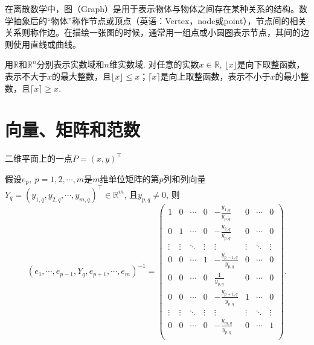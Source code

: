 在离散数学中，图（Graph）是用于表示物体与物体之间存在某种关系的结构。数学抽象后的“物体”称作节点或顶点（英语：Vertex，node或point），节点间的相关关系则称作边。在描绘一张图的时候，通常用一组点或小圆圈表示节点，其间的边则使用直线或曲线。

用$\mathbb{R}$和$\mathbb{R}^{n}$分别表示实数域和$n$维实数域. 对任意的实数$x \in \mathbb{R}$, $\lfloor x \rfloor$是向下取整函数，表示不大于$x$的最大整数，且$ \lfloor x \rfloor \leq x$；$\lceil x \rceil$是向上取整函数，表示不小于$x$的最小整数，且$\lceil x \rceil \geq x$.
 
\section{向量、矩阵和范数}
二维平面上的一点$P=(x,y)^{\top}$

\begin{lemma}\label{Lemma4EmYqK}
	假设$e_p,~p=1,2,\cdots,m$是$m$维单位矩阵的第$p$列和列向量$Y_{q} = \left( y_{1,q}, y_{2,q}, \cdots, y_{m,q} \right)^\top \in \mathbb{R}^{m}$, 且$y_{p,q} \neq 0$,  则
	\begin{equation*}
	 \left( e_1, \cdots,e_{p-1}, Y_{q}, e_{p+1}, \cdots, e_m \right)^{-1}  = 
	  	   		\begin{pmatrix} 
		  		1 	   & 0      & \cdots  & 0 			  & -\frac{y_{1,q}}{y_{p,q}}  	& 0 	& \cdots   & 0\\
		  		0 	   & 1      & \cdots  & 0 			  & -\frac{y_{2,q}}{y_{p,q}}  	& 0 	& \cdots   & 0\\
		  		\vdots & \vdots & \ddots  & \vdots 	      &  \vdots     	& \vdots  	& \ddots  & \vdots\\
		  		0      & 0      & \cdots  & 1  			  & -\frac{y_{p-1,q}}{y_{p,q}}  	& 0 	& \cdots   & 0\\	  		
		  		0      & 0      & \cdots  & 0  			  & \frac{1}{y_{p,q}}  	& 0 	& \cdots   & 0\\
		  		0      & 0      & \cdots  & 0  			  & -\frac{y_{p+1,q}}{y_{p,q}}  	& 1 	& \cdots   & 0\\
		  		\vdots & \vdots & \ddots  & \vdots  	  & \vdots  		& \vdots  	& \ddots   & \vdots\\	
		  		0      & 0      & \cdots  & 0  			   & -\frac{y_{m,q}}{y_{p,q}}     & 0     & \cdots   & 1\\	  		
			\end{pmatrix} .
	\end{equation*}
\end{lemma}


